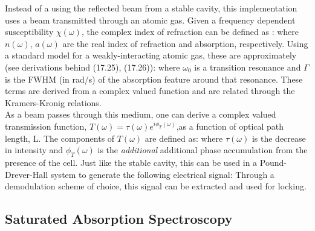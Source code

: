 Instead of a using the reflected beam from a stable cavity, this implementation uses a beam transmitted through an atomic gas. Given a frequency dependent susceptibility $\chi(\omega)$, the complex index of refraction can be defined as \cite{steckoptics}:
where $n(\omega)$, $a(\omega)$ are the real index of refraction and absorption, respectively. Using a standard model for a weakly-interacting atomic gas, these are approximately \cite{steckoptics} (see derivations behind (17.25), (17.26)):
where $\omega_0$ is a transition resonance and $\Gamma$ is the FWHM (in rad/s) of the absorption feature around that resonance. These terms are derived from a complex valued function and are related through the Kramers-Kronig relations.\\

As a beam passes through this medium, one can derive a complex valued transmission function, $T(\omega)=\tau(\omega)e^{i\phi_T(\omega)}$,as a function of optical path length, L. The components of $T(\omega)$ are defined as:
where $\tau(\omega)$ is the decrease in intensity and $\phi_T(\omega)$ is the \emph{additional} additional phase accumulation from the presence of the cell. Just like the stable cavity, this can be used in a Pound-Drever-Hall system to generate the following electrical signal:
Through a demodulation scheme of choice, this signal can be extracted and used for locking.


\subsection{Saturated Absorption Spectroscopy}
\label{sec:sat_abs}

